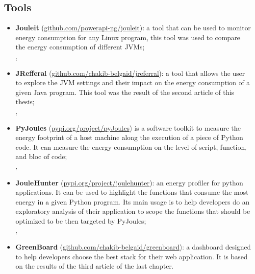 \subsection*{Tools}
\begin{itemize}
      \item \textbf{Jouleit} (\url{github.com/powerapi-ng/jouleit}): a tool that can be used to monitor energy consumption for any Linux program, this tool was used to compare the energy consumption of different JVMs;
            \\
            ,
      \item \textbf{JRefferal} (\url{github.com/chakib-belgaid/jreferral}): a tool that allows the user to explore the JVM settings and their impact on the energy consumption of a given Java program. This tool was the result of the second article of this thesis;
            \\
            ,
      \item \textbf{PyJoules} (\url{pypi.org/project/pyJoules}) is a software toolkit to measure the energy footprint of a host machine along the execution of a piece of Python code. It can measure the energy consumption on the level of script, function, and bloc of code;
            \\
            ,
      \item \textbf{JouleHunter} (\url{pypi.org/project/joulehunter}): an energy profiler for python applications. It can be used to highlight the functions that consume the most energy in a given Python program. Its main usage is to help developers do an exploratory analysis of their application to scope the functions that should be optimized to be then targeted by PyJoules;
            \\
            ,
      \item \textbf{GreenBoard} (\url{github.com/chakib-belgaid/greenboard}): a dashboard designed to help developers choose the best stack for their web application. It is based on the results of the third article of the last chapter.
\end{itemize}

